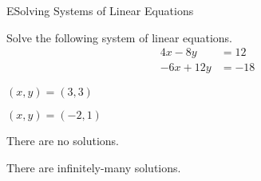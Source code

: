 \documentclass{article}[12pt]
\begin{document}
\begin{module}{E}{Solving Systems of Linear Equations}
\begin{readinessAssuranceTest}
\item Solve the following system of linear equations.
      \begin{align*}
      4x-8y   &= 12 \\
      -6x+12y  &=  -18
      \end{align*}

\begin{multicols}{4}
\begin{readinessAssuranceTestChoices}
\item
\((x,y)=(3,3)\)
\item
\((x,y)=(-2,1)\)
\item There are no solutions.
\item There are infinitely-many solutions. %
\end{readinessAssuranceTestChoices}
\end{multicols}

\end{readinessAssuranceTest}
\end{module}
\end{document}
